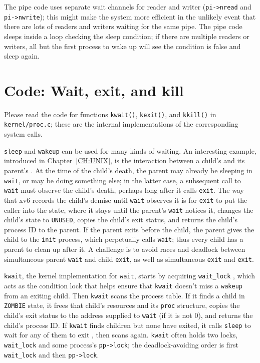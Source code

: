 The pipe code uses separate wait channels for reader and writer
(\lstinline{pi->nread}
and
\lstinline{pi->nwrite});
this might make the system more efficient in the unlikely
event that there are lots of
readers and writers waiting for the same pipe.
The pipe code sleeps inside a loop checking the
sleep condition; if there are multiple readers
or writers, all but the first process to wake up
will see the condition is false and sleep again.
\section{Code: Wait, exit, and kill}

Please read the code for functions {\tt kwait()}, {\tt kexit()},
and {\tt kkill()} in {\tt kernel/proc.c}; these are the
internal implementations of the corresponding system calls.

\lstinline{sleep}
and
\lstinline{wakeup}
can be used for many kinds of waiting.
An interesting example, introduced in Chapter~\ref{CH:UNIX},
is the interaction between a child's 
and its parent's .
At the time of the child's death, the parent may already
be sleeping in {\tt wait}, or may be doing something else;
in the latter case, a subsequent call to {\tt wait} must
observe the child's death, perhaps long after it calls {\tt exit}.
The way that xv6 records the child's demise until {\tt wait}
observes it is for {\tt exit} to put the caller into the 
state, where it stays until the parent's {\tt wait} notices it, changes
the child's state to {\tt UNUSED}, copies the child's exit status,
and returns the child's process ID to the parent.
If the parent exits before the child, the 
parent gives the child to the
\lstinline{init}
process, which perpetually calls {\tt wait};
thus
every child has a parent to clean up after it.
A challenge is
to avoid races and deadlock between
simultaneous parent 
\lstinline{wait}
and child
\lstinline{exit},
as well as simultaneous
\lstinline{exit} and \lstinline{exit}.

\lstinline{kwait}, the kernel implementation
for {\tt wait}, starts by acquiring
\lstinline{wait_lock}
,
which acts as the condition
lock that helps ensure that \lstinline{kwait} doesn't miss a \lstinline{wakeup}
from an exiting child.
Then \lstinline{kwait} scans the process table.
If it finds a child in \texttt{ZOMBIE} state,
it frees that child's resources and
its \lstinline{proc} structure, copies
the child's exit status to the address supplied to \lstinline{wait}
(if it is not 0),
and returns the child's process ID.
If 
\lstinline{kwait}
finds children but none have exited,
it calls
\lstinline{sleep}
to wait for any of them to exit
,
then scans again.
\lstinline{kwait} often holds two locks,
\lstinline{wait_lock} and some process's \lstinline{pp->lock};
the deadlock-avoiding order is first \lstinline{wait_lock}
and then \lstinline{pp->lock}.

